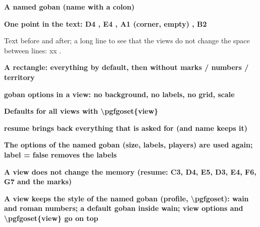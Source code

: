 \documentclass{article}
\newcommand\case[1]{\par\medskip\noindent\textbf{#1}\par\nopagebreak}
\begin{document}
\case{A named goban (name with a colon)}
\begin{goban}[9, name = gob:a]
\end{goban}

\case{One point in the text: D4 , E4 \pgfgoview{gob:a}{E4}, A1 (corner, empty) \pgfgoview{gob:a}{A1}, B2 \pgfgoview{gob:a}{B2}}
Text before  and after; a long line to see that the
views do not change the space between lines: xx  .

\case{A rectangle: everything by default, then without marks / numbers / territory}
  

\case{goban options in a view: no background, no labels, no grid, scale}
 

\case{Defaults for all views with \textbackslash pgfgoset\{view\}}
{}

\case{resume brings back everything that is asked for (and name keeps it)}
\begin{goban}[9, resume = {gob:a, numbers, marks, territory}, name = b, partial = A1:E5]\end{goban}
 

\case{The options of the named goban (size, labels, players) are used again; label = false removes the labels}
\begin{goban}[5, name = small, label, players = {white = {stone = {fill = {color = yellow}}}}]\end{goban}
  

\case{A view does not change the memory (resume: C3, D4, E5, D3, E4, F6, G7 and the marks)}
\begin{goban}[9, resume = {gob:a, marks}]\end{goban}

\case{A view keeps the style of the named goban (profile, \textbackslash pgfgoset): wain and roman numbers; a default goban inside wain; view options and \textbackslash pgfgoset\{view\} go on top}
{%
\begin{goban}[5, name = styled]\end{goban}}
 {}
{}
\end{document}
